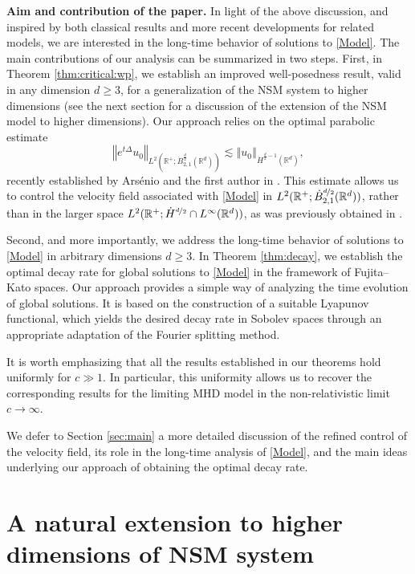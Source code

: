 \documentclass[11pt, leqno, a4paper,]{amsart}
\theoremstyle{remark}
\numberwithin{equation}{section}
\newcommand*{\norm}[1]{\left\Vert #1\right\Vert}
\begin{document}
\medskip
\noindent\textbf{Aim and contribution of the paper.}
In light of the above discussion, and inspired by both classical results \cite{S86} and more recent developments \cite{BS18, D26, HDA20} for related models, we are interested in the long-time behavior of solutions to \eqref{Model}. The main contributions of our analysis can be summarized in two steps.
First, in Theorem \ref{thm:critical:wp}, we establish an improved well-posedness result, valid in any dimension $d\geq 3$, for a generalization of the NSM system to higher dimensions (see the next section for a discussion of the extension of the NSM model to higher dimensions). Our approach relies on the optimal parabolic estimate
\begin{equation*}
\norm{e^{t\Delta}u_0}_{L^2(\mathbb R^+;\dot B^{\frac{d}{2}}_{2,1}(\mathbb R^d))}
\lesssim
\norm{u_0}_{\dot H^{\frac{d}{2}-1}(\mathbb R^d)},
\end{equation*}
recently established by Ars\'enio and the first author in \cite{ah}. This estimate allows us to control the velocity field associated with \eqref{Model} in
$L^2(\mathbb R^+;\dot B^{\nicefrac{d}{2}}_{2,1}(\mathbb R^d))$, rather than in the larger space $L^2(\mathbb R^+;\dot H^{\nicefrac{d}{2}} \cap  L^\infty(\mathbb R^d))$, as was previously obtained in \cite{GIM14}.

Second, and more importantly, we address the long-time behavior of solutions to \eqref{Model} in arbitrary dimensions $d\geq 3$. In Theorem \ref{thm:decay}, we establish the optimal decay rate for global solutions to \eqref{Model} in the framework of Fujita--Kato spaces. Our approach provides a simple way of analyzing the time evolution of global solutions. It is based on the construction of a suitable Lyapunov functional, which yields the desired decay rate in Sobolev spaces through an appropriate adaptation of the Fourier splitting method.

It is worth emphasizing that all the results established in our theorems hold uniformly for $c\gg1$. In particular, this uniformity allows us to recover the corresponding results for the limiting MHD model in the non-relativistic limit $c\to\infty$.

 We defer to Section \ref{sec:main} a more detailed discussion of the refined control of the velocity field, its role in the long-time analysis of \eqref{Model}, and the main ideas underlying our approach of  obtaining the optimal decay rate. 
  
\section{A natural extension to higher dimensions of NSM system}\label{section:extension}
\end{document}
